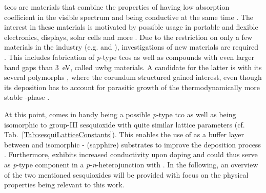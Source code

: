 \glspl{tco} are materials that combine the properties of having low absorption coefficient in the visible spectrum and being conductive at the same time
    \cite{kehoe2016}.
The interest in these materials is motivated by possible usage in portable and flexible electronics, displays, solar cells and more
    \cite{ginley2011}.
Due to the restriction on only a few materials in the industry (e.g.  and ), investigations of new materials are required
    \cite{ginley2011}.
This includes fabrication of \textit{p}-type \glspl{tco} as well as compounds with even larger band gaps than \qty{3}{eV}, called \gls{uwbg} materials.
A candidate for the latter is  with its several polymorphs
    \cite{hassa2021a},
where the corundum structured \agao{} gained interest, even though its deposition has to account for parasitic growth of the thermodynamically more stable \textbeta-phase
    \cite{petersen2023}.

At this point,  comes in handy being a possible \textit{p}-type \gls{tco} as well as being isomorphic to group-III sesquioxide \agao{} with quite similar lattice parameters (cf. Tab.~\ref{Tab:sesquiLatticeConstants}).
This enables the use of  as a buffer layer between \agao{} and isomorphic \textalpha- (sapphire) substrates to improve the deposition process
    \cite{stepanov2021}.
Furthermore,  exhibits increased conductivity upon doping
    \cite{uekawa1996}
and could thus serve as \textit{p}-type component in a \textit{p}-\textit{n}-heterojunction with \agao{}.
In the following, an overview of the two mentioned sesquioxides will be provided with focus on the physical properties being relevant to this work.
